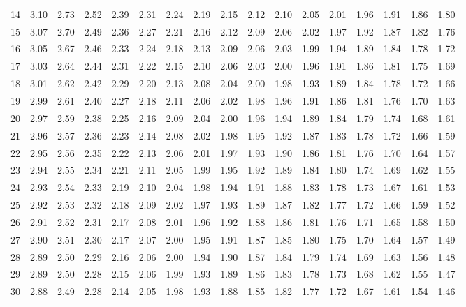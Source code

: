 \begin{center}
\begin{tabular}{r|cccccccccccccccc}
14 & 3.10 & 2.73 & 2.52 & 2.39 & 2.31 & 2.24 & 2.19 & 2.15 & 2.12 & 2.10 & 2.05 & 2.01 & 1.96 & 1.91 & 1.86 & 1.80\\
15 & 3.07 & 2.70 & 2.49 & 2.36 & 2.27 & 2.21 & 2.16 & 2.12 & 2.09 & 2.06 & 2.02 & 1.97 & 1.92 & 1.87 & 1.82 & 1.76\\
16 & 3.05 & 2.67 & 2.46 & 2.33 & 2.24 & 2.18 & 2.13 & 2.09 & 2.06 & 2.03 & 1.99 & 1.94 & 1.89 & 1.84 & 1.78 & 1.72\\
17 & 3.03 & 2.64 & 2.44 & 2.31 & 2.22 & 2.15 & 2.10 & 2.06 & 2.03 & 2.00 & 1.96 & 1.91 & 1.86 & 1.81 & 1.75 & 1.69\\
18 & 3.01 & 2.62 & 2.42 & 2.29 & 2.20 & 2.13 & 2.08 & 2.04 & 2.00 & 1.98 & 1.93 & 1.89 & 1.84 & 1.78 & 1.72 & 1.66\\
19 & 2.99 & 2.61 & 2.40 & 2.27 & 2.18 & 2.11 & 2.06 & 2.02 & 1.98 & 1.96 & 1.91 & 1.86 & 1.81 & 1.76 & 1.70 & 1.63\\
20 & 2.97 & 2.59 & 2.38 & 2.25 & 2.16 & 2.09 & 2.04 & 2.00 & 1.96 & 1.94 & 1.89 & 1.84 & 1.79 & 1.74 & 1.68 & 1.61\\
21 & 2.96 & 2.57 & 2.36 & 2.23 & 2.14 & 2.08 & 2.02 & 1.98 & 1.95 & 1.92 & 1.87 & 1.83 & 1.78 & 1.72 & 1.66 & 1.59\\
22 & 2.95 & 2.56 & 2.35 & 2.22 & 2.13 & 2.06 & 2.01 & 1.97 & 1.93 & 1.90 & 1.86 & 1.81 & 1.76 & 1.70 & 1.64 & 1.57\\
23 & 2.94 & 2.55 & 2.34 & 2.21 & 2.11 & 2.05 & 1.99 & 1.95 & 1.92 & 1.89 & 1.84 & 1.80 & 1.74 & 1.69 & 1.62 & 1.55\\
24 & 2.93 & 2.54 & 2.33 & 2.19 & 2.10 & 2.04 & 1.98 & 1.94 & 1.91 & 1.88 & 1.83 & 1.78 & 1.73 & 1.67 & 1.61 & 1.53\\
25 & 2.92 & 2.53 & 2.32 & 2.18 & 2.09 & 2.02 & 1.97 & 1.93 & 1.89 & 1.87 & 1.82 & 1.77 & 1.72 & 1.66 & 1.59 & 1.52\\
26 & 2.91 & 2.52 & 2.31 & 2.17 & 2.08 & 2.01 & 1.96 & 1.92 & 1.88 & 1.86 & 1.81 & 1.76 & 1.71 & 1.65 & 1.58 & 1.50\\
27 & 2.90 & 2.51 & 2.30 & 2.17 & 2.07 & 2.00 & 1.95 & 1.91 & 1.87 & 1.85 & 1.80 & 1.75 & 1.70 & 1.64 & 1.57 & 1.49\\
28 & 2.89 & 2.50 & 2.29 & 2.16 & 2.06 & 2.00 & 1.94 & 1.90 & 1.87 & 1.84 & 1.79 & 1.74 & 1.69 & 1.63 & 1.56 & 1.48\\
29 & 2.89 & 2.50 & 2.28 & 2.15 & 2.06 & 1.99 & 1.93 & 1.89 & 1.86 & 1.83 & 1.78 & 1.73 & 1.68 & 1.62 & 1.55 & 1.47\\
30 & 2.88 & 2.49 & 2.28 & 2.14 & 2.05 & 1.98 & 1.93 & 1.88 & 1.85 & 1.82 & 1.77 & 1.72 & 1.67 & 1.61 & 1.54 & 1.46\\

\end{tabular}
\end{center}
